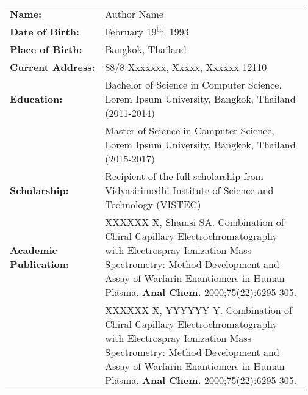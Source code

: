 \renewcommand{\arraystretch}{1.5} %
\leftskip-0.29cm
\begin{longtable}{p{0.31\linewidth}p{0.66\linewidth}}

\textbf{Name:}                      &       Author Name \\

\textbf{Date of Birth:}             &       February 19$^{\mathrm{th}}$, 1993   \\

\textbf{Place of Birth:}            &       Bangkok, Thailand  \\

\textbf{Current Address:}           &       88/8 Xxxxxxx, Xxxxx, Xxxxxx 12110 \\

\textbf{Education:}                 &       Bachelor of Science in Computer Science, Lorem Ipsum University, Bangkok, Thailand (2011-2014) \\
{}                                  &       Master of Science in Computer Science, Lorem Ipsum University, Bangkok, Thailand (2015-2017)   
 \\
 
\textbf{Scholarship:}               &       Recipient of the full scholarship from Vidyasirimedhi \break Institute of Science and Technology (VISTEC)  \\

\textbf{Academic Publication:}      &      XXXXXX X, Shamsi SA. Combination of Chiral Capillary Electrochromatography with Electrospray Ionization Mass Spectrometry: Method Development and Assay of Warfarin Enantiomers in Human Plasma. \textbf{Anal Chem.} 2000;75(22):6295-305. \\
{}                                  &       
XXXXXX X, YYYYYY Y. Combination of Chiral Capillary Electrochromatography with Electrospray Ionization Mass Spectrometry: Method Development and Assay of Warfarin Enantiomers in Human Plasma. \textbf{Anal Chem.} 2000;75(22):6295-305. 

\end{longtable}
